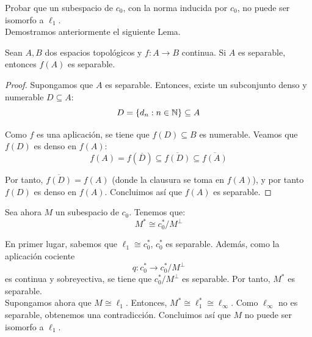 \begin{ejercicio}
    Probar que un subespacio de $c_0$, con la norma inducida por $c_0$, no puede ser isomorfo a $\ell_1$.\\

    Demostramos anteriormente el siguiente Lema.
    \begin{lema}
        Sean $A,B$ dos espacios topológicos y $f:A\to B$ continua. Si $A$ es separable, entonces $f(A)$ es separable.
        \begin{proof}
            Supongamos que $A$ es separable. Entonces, existe un subconjunto denso y numerable $D \subseteq A$:
            \begin{equation*}
                D = \{d_n : n \in \mathbb{N}\} \subseteq A
            \end{equation*}

            Como $f$ es una aplicación, se tiene que $f(D) \subseteq B$ es numerable. Veamos que $f(D)$ es denso en $f(A)$:
            \begin{equation*}
                f(A) = f\left(\overline{D}\right) \subseteq \overline{f(D)}\subseteq \overline{f(A)}
            \end{equation*}

            Por tanto, $\overline{f(D)} = f(A)$ (donde la clausura se toma en $f(A)$), y por tanto $f(D)$ es denso en $f(A)$. Concluimos así que $f(A)$ es separable.
        \end{proof}
    \end{lema}

    Sea ahora $M$ un subespacio de $c_0$. Tenemos que:
    \begin{equation*}
        M^* \cong c_0^*/M^\perp
    \end{equation*}

    En primer lugar, sabemos que $\ell_1 \cong c_0^*$, $c_0^*$ es separable. Además, como la aplicación cociente
    \begin{equation*}
        q: c_0^* \longrightarrow c_0^*/M^\perp
    \end{equation*}
    es continua y sobreyectiva, se tiene que $c_0^*/M^\perp$ es separable. Por tanto, $M^*$ es separable.\\

    Supongamos ahora que $M \cong \ell_1$. Entonces, $M^* \cong \ell_1^* \cong \ell_\infty$. Como $\ell_\infty$ no es separable, obtenemos una contradicción. Concluimos así que $M$ no puede ser isomorfo a $\ell_1$.
\end{ejercicio}

